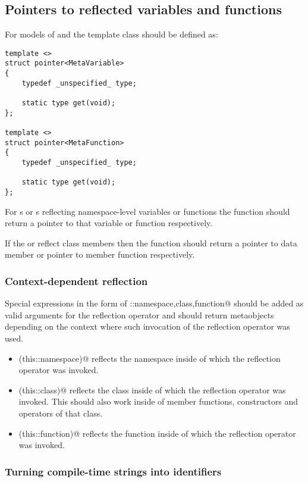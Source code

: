 \subsection{Pointers to reflected variables and functions}

For models of  and  the \verb@pointer@ template class
should be defined as:

\begin{verbatim}
template <>
struct pointer<MetaVariable>
{
	typedef _unspecified_ type;

	static type get(void);
};

template <>
struct pointer<MetaFunction>
{
	typedef _unspecified_ type;

	static type get(void);
};
\end{verbatim}

For s or s reflecting namespace-level variables or functions
the \verb@get@ function should return a pointer to that variable or function respectively.

If the  or  reflect class members then the \verb@get@ function
should return a pointer to data member or pointer to member function respectively.

\subsubsection{Context-dependent reflection}

Special expressions in the form of \verb@this::{namespace,class,function}@ should be added
as valid arguments for the reflection operator and should return metaobjects depending
on the context where such invocation of the reflection operator was used.

\begin{itemize}
\item{\verb@mirrored(this::namespace)@} reflects the namespace inside of which the reflection
operator was invoked.
\item{\verb@mirrored(this::class)@} reflects the class inside of which the reflection
operator was invoked. This should also work inside of member functions, constructors and operators
of that class.
\item{\verb@mirrored(this::function)@} reflects the function inside of which the reflection
operator was invoked.
\end{itemize}


\subsubsection{Turning compile-time strings into identifiers}

